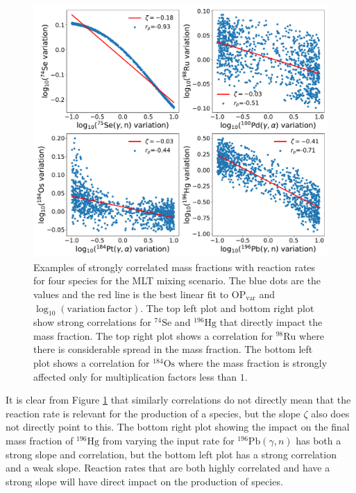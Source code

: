 \begin{figure}[!htbp]
\includegraphics[width=\textwidth]{chapters/2/figures/correlation_example.pdf}
\caption{Examples of strongly correlated mass fractions with reaction rates for four species for the MLT mixing scenario. The blue dots are the values and the red line is the best linear fit to $\mathrm{OP}_{\mathrm{var}}$ and $\log_{10}(\mathrm{variation~factor})$. The top left plot and bottom right plot show strong correlations for $^{74}\mathrm{Se}$ and $^{196}\mathrm{Hg}$ that directly impact the mass fraction. The top right plot shows a correlation for $^{98}\mathrm{Ru}$ where there is considerable spread in the mass fraction. The bottom left plot shows a correlation for $^{184}\mathrm{Os}$ where the mass fraction is strongly affected only for multiplication factors less than $1$. 
\label{fig:corr_ex}}
\end{figure}

It is clear from Figure \ref{fig:corr_ex} that similarly correlations do not directly mean that the reaction rate is relevant for the production of a species, but the slope $\zeta$ also does not directly point to this.
The bottom right plot showing the impact on the final mass fraction of $^{196}\mathrm{Hg}$ from varying the input rate for $^{196}\mathrm{Pb}(\gamma,n)$ has both a strong slope and correlation, but the bottom left plot has a strong correlation and a weak slope.
Reaction rates that are both highly correlated and have a strong slope will have direct impact on the production of species.

